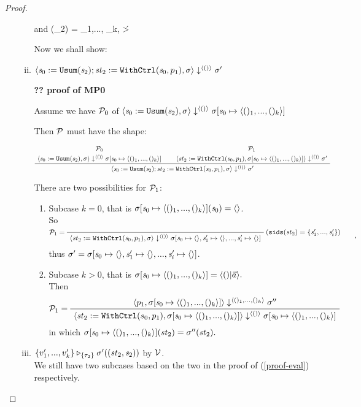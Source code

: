 \begin{proof}
\begin{itemize}
\begin{enumerate}[(i)]
    and 
    {\sgm(\s_2) = \< \F_1,..., \F_k, \T \'>}
	

    Now we shall show: 
	\item \label{proof-eval}
	$\seval{\sdef{\s_0}{\usum(\s_2)}; \withctrl{\s_0}{p_1}{\st_2}}{\sgm}{\singl{()}}{\sgm'}$
	
	\textbf{?? proof of MP0}
	
	Assume we have 
	$\MP_0$ of $ \seval{\sdef{\s_0}{\usum(\s_2)}}{\sgm}{\singl{()}}{\sgm[\s_0 \|-> \vrange{()_1}{()_k}]}$
	
	Then $\MP$ must have the shape:
	
	$$ \PT{
		\UCN{\MP_0}{\seval{\sdef{\s_0}{\usum(\s_2)}}{\sgm}{\singl{()}}{\sgm[\s_0 \|-> \vrange{()_1}{()_k}]}}
		\UCN{\MP_1}{\seval{\withctrl{\s_0}{p_1}{\st_2}}{\sgm[\s_0 \|-> \vrange{()_1}{()_k}]}{\<()\'>}{\sgm'}}
		\BC{\seval{\sdef{\s_0}{\usum(\s_2)}; \withctrl{\s_0}{p_1}{\st_2}}{\sgm}{\singl{()}}{\sgm'}}
	} $$
	
	There are two possibilities for $\MP_1$: 
	\begin{enumerate}
	
		\item \label{subcase-1}
		Subcase $k=0$, that is $\sgm[\s_0 \|-> \vrange{()_1}{()_k}](\s_0) = \emptyv$.\\
		So 
	$$\PT{
		\AC{}
		\RiLa{(\sids{\st_2} = \{\s'_1,...,\s'_i\})}
		\LeLa{\MP_1 = }
		\UC{\seval{\withctrl{\s_0}{p_1}{\st_2}}{\sgm}{\< () \'>}
			{\sgm[\s_0 \|-> \emptyv, \s_1' \|-> \emptyv, ..., \s_i' \|-> \emptyv]}}
	  },$$ 
    thus $\sgm' = \sgm[\s_0 \|-> \emptyv, \s_1' \|-> \emptyv, ..., \s_i' \|-> \emptyv]$. 
	
	\item \label{subcase-2}
	Subcase $k > 0$, that is $\sgm[\s_0 \|-> \vrange{()_1}{()_k}] = \< ()|\a \'> .$ \\
	Then 
	$$\PT{
		\AC{\seval{p_1}{\sgm[\s_0 \|-> \vrange{()_1}{()_k}]}{\vrange{()_1}{()_k}}{\sgm''}}
		\LeLa{\MP_1 = }
		\UC{\seval{\withctrl {s_0} {p_1} {\st_2} } 
				  {\sgm[\s_0 \|->   \vrange{()_1}{()_k}]} 
				  {\< () \'>} 
				  {\sgm[\s_0 \|-> \<()_1,...,()_k \'>]}}
	}$$ in which $\sgm[\s_0 \|-> \<()_1,...,()_k \'>](\st_2) = \sgm''(\st_2).$

	\end{enumerate}

	
	\item \label{proof-valre}
	$\ValRep{\Seqk{v'}}{\tseq{\tau_2}}{\sgm'((\st_2,\s_2))}$ by $\MV$. \\
    We still have two subcases based on the two in the proof of (\ref{proof-eval}) respectively.
    

\end{enumerate}
\end{itemize}
\end{proof}
